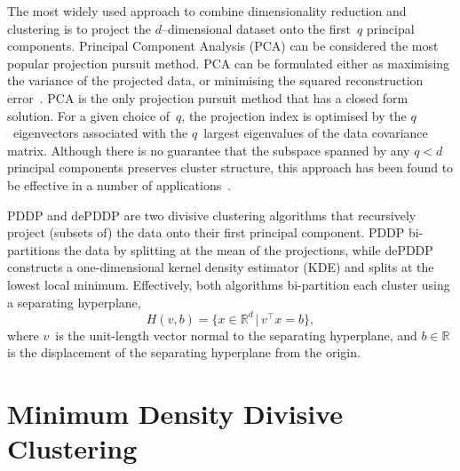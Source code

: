 \documentclass{book}
\def\R{\mathbb{R}}
\begin{document}
The most widely used approach to combine dimensionality reduction and
clustering is to project the $d$--dimensional dataset onto the first~$q$ principal components. 
%
Principal Component Analysis (PCA) can be considered the most popular projection
pursuit method. PCA can be formulated either as maximising the variance of the
projected data, or minimising the squared reconstruction
error~\cite{Jolliffe1986}. PCA is the only projection pursuit method that has
a closed form solution. For a given choice of~$q$, the projection index is
optimised by the $q$~eigenvectors associated with the $q$~largest eigenvalues
of the data covariance matrix.
%
Although there is no guarantee that the subspace spanned by any $q<d$
principal components preserves cluster structure, this approach has been found
to be effective in a number of applications~\cite{KriegelKZ2009}.

PDDP and dePDDP are two divisive clustering algorithms that recursively
project (subsets of) the data onto their first principal component.
PDDP bi-partitions the data by splitting at the mean of the projections, while
dePDDP constructs a one-dimensional kernel density estimator (KDE) and splits
at the lowest local minimum.
%
Effectively, both algorithms bi-partition each cluster 
using a separating hyperplane,
\[
H(v,b) = \{x \in \R^d \,|\, v^\top x= b\},
\]
where $v$~is the unit-length
vector normal to the separating hyperplane,
and $b \in \R$ is the displacement of the separating hyperplane from the origin.


\section{Minimum Density Divisive Clustering}
\end{document}
